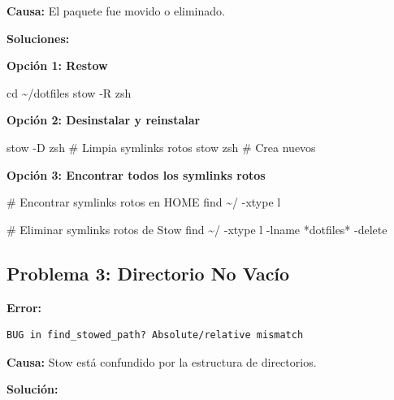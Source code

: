 \documentclass[
  doc,
  floatsintext,
  longtable,
  a4paper,
  nolmodern,
  notxfonts,
  notimes,
  12pt,
  colorlinks=true,linkcolor=blue,citecolor=blue,urlcolor=blue]{apa7}
\newenvironment{Shaded}{\begin{snugshade}}{\end{snugshade}}
\newcommand{\AttributeTok}[1]{\textcolor[rgb]{0.40,0.45,0.13}{#1}}
\newcommand{\BuiltInTok}[1]{\textcolor[rgb]{0.00,0.23,0.31}{#1}}
\newcommand{\CommentTok}[1]{\textcolor[rgb]{0.37,0.37,0.37}{#1}}
\newcommand{\ExtensionTok}[1]{\textcolor[rgb]{0.00,0.23,0.31}{#1}}
\newcommand{\FunctionTok}[1]{\textcolor[rgb]{0.28,0.35,0.67}{#1}}
\newcommand{\NormalTok}[1]{\textcolor[rgb]{0.00,0.23,0.31}{#1}}
\newcommand{\StringTok}[1]{\textcolor[rgb]{0.13,0.47,0.30}{#1}}
\begin{document}
\textbf{Causa:} El paquete fue movido o eliminado.

\textbf{Soluciones:}

\textbf{Opción 1: Restow}

\begin{Shaded}
\begin{Highlighting}[]
\BuiltInTok{cd}\NormalTok{ \textasciitilde{}/dotfiles}
\ExtensionTok{stow} \AttributeTok{{-}R}\NormalTok{ zsh}
\end{Highlighting}
\end{Shaded}

\textbf{Opción 2: Desinstalar y reinstalar}

\begin{Shaded}
\begin{Highlighting}[]
\ExtensionTok{stow} \AttributeTok{{-}D}\NormalTok{ zsh  }\CommentTok{\# Limpia symlinks rotos}
\ExtensionTok{stow}\NormalTok{ zsh     }\CommentTok{\# Crea nuevos}
\end{Highlighting}
\end{Shaded}

\textbf{Opción 3: Encontrar todos los symlinks rotos}

\begin{Shaded}
\begin{Highlighting}[]
\CommentTok{\# Encontrar symlinks rotos en HOME}
\FunctionTok{find}\NormalTok{ \textasciitilde{}/ }\AttributeTok{{-}xtype}\NormalTok{ l}

\CommentTok{\# Eliminar symlinks rotos de Stow}
\FunctionTok{find}\NormalTok{ \textasciitilde{}/ }\AttributeTok{{-}xtype}\NormalTok{ l }\AttributeTok{{-}lname} \StringTok{\textquotesingle{}*dotfiles*\textquotesingle{}} \AttributeTok{{-}delete}
\end{Highlighting}
\end{Shaded}

\subsection{Problema 3: Directorio No
Vacío}\label{problema-3-directorio-no-vacuxedo}

\textbf{Error:}

\begin{verbatim}
BUG in find_stowed_path? Absolute/relative mismatch
\end{verbatim}

\textbf{Causa:} Stow está confundido por la estructura de directorios.

\textbf{Solución:}
\end{document}
